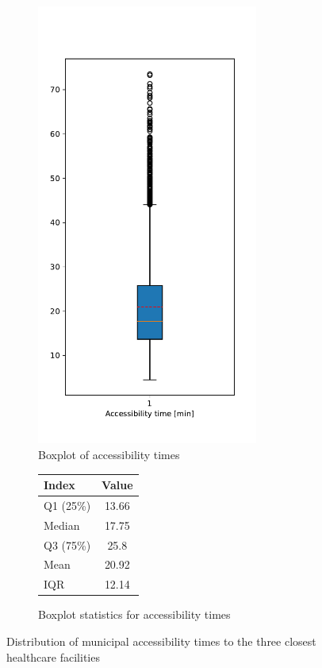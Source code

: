 \begin{figure}[tbp]
	\begin{subfigure}{0.2\textwidth}
		\includegraphics[width=0.8\textwidth]{img/boxplot_acc_by_comm_2023n3.pdf}
		\caption{Boxplot of accessibility times}
		\label{boxplot:acc_by_comm_2023n3}
	\end{subfigure}
	\hfill
	
	\begin{subfigure}{0.4\textwidth}
		\begin{tabular}{l S[table-alignment-mode=marker]}
			\toprule
			\textbf{Index} & \textbf{Value}\\
			\midrule
			Q1 (25\%) & 13.66\\
			Median & 17.75\\
			Q3 (75\%) & 25.8\\
			Mean & 20.92\\
			IQR & 12.14\\
			\bottomrule
		\end{tabular}
		\caption{Boxplot statistics for accessibility times}
		\label{tab:boxplot_idxs}
	\end{subfigure}
	
	\caption{Distribution of municipal accessibility times to the three closest healthcare facilities}
\end{figure}
